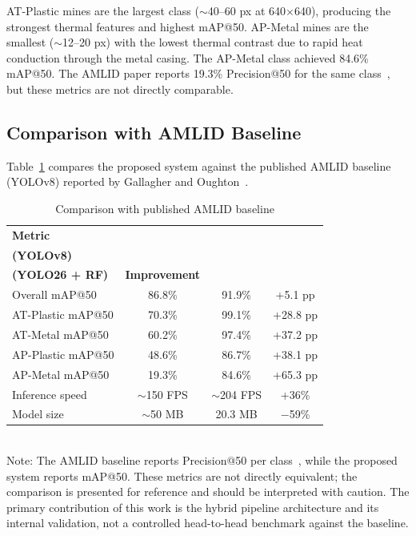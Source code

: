 \documentclass[conference]{IEEEtran}
\begin{document}
AT-Plastic mines are the largest class ($\sim$40--60 px at 640$\times$640), producing the strongest thermal features and highest mAP@50. AP-Metal mines are the smallest ($\sim$12--20 px) with the lowest thermal contrast due to rapid heat conduction through the metal casing. The AP-Metal class achieved 84.6\% mAP@50. The AMLID paper reports 19.3\% Precision@50 for the same class~\cite{gallagher2025}, but these metrics are not directly comparable.

\subsection{Comparison with AMLID Baseline}

Table~\ref{tab:comparison} compares the proposed system against the published AMLID baseline (YOLOv8) reported by Gallagher and Oughton~\cite{gallagher2025}.

\begin{table}[t]
  \centering
  \caption{Comparison with published AMLID baseline}
  \label{tab:comparison}
  \begin{tabular}{lccc}
    \hline
    \textbf{Metric} & \shortstack{\textbf{AMLID}\\\textbf{(YOLOv8)}} & \shortstack{\textbf{Proposed}\\\textbf{(YOLO26 + RF)}} & \textbf{Improvement} \\
    \hline
    Overall mAP@50    & 86.8\%   & 91.9\%   & +5.1 pp \\
    AT-Plastic mAP@50 & 70.3\%   & 99.1\%   & +28.8 pp \\
    AT-Metal mAP@50   & 60.2\%   & 97.4\%   & +37.2 pp \\
    AP-Plastic mAP@50 & 48.6\%   & 86.7\%   & +38.1 pp \\
    AP-Metal mAP@50   & 19.3\%   & 84.6\%   & +65.3 pp \\
    Inference speed   & $\sim$150 FPS & $\sim$204 FPS & +36\% \\
    Model size        & $\sim$50 MB  & 20.3 MB   & $-$59\% \\
    \hline
  \end{tabular}\\[4pt]
  {\footnotesize Note: The AMLID baseline reports Precision@50 per class~\cite{gallagher2025}, while the proposed system reports mAP@50. These metrics are not directly equivalent; the comparison is presented for reference and should be interpreted with caution. The primary contribution of this work is the hybrid pipeline architecture and its internal validation, not a controlled head-to-head benchmark against the baseline.}
\end{table}
\end{document}
